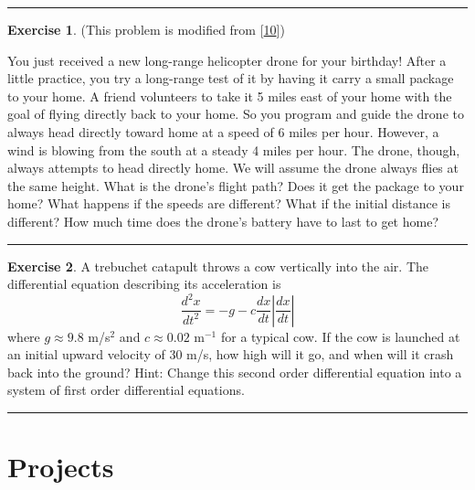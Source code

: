 \documentclass[
]{book}
\theoremstyle{definition}
\theoremstyle{definition}
\theoremstyle{definition}
\newtheorem{exercise}{Exercise}[chapter]
\theoremstyle{remark}
\begin{document}
\begin{center}\rule{0.5\linewidth}{0.5pt}\end{center}

\begin{exercise}
\protect\hypertarget{exr:unnamed-chunk-506}{}{\label{exr:unnamed-chunk-506} }(This problem is modified from {[}\protect\hyperlink{ref-drone}{10}{]})

You just received a new long-range helicopter drone for your birthday!
After a little practice, you try a long-range test of it by having it
carry a small package to your home. A friend volunteers to take it 5
miles east of your home with the goal of flying directly back to your
home. So you program and guide the drone to always head directly toward
home at a speed of 6 miles per hour. However, a wind is blowing from the
south at a steady 4 miles per hour. The drone, though, always attempts
to head directly home. We will assume the drone always flies at the same
height. What is the drone's flight path? Does it get the package to your
home? What happens if the speeds are different? What if the initial
distance is different? How much time does the drone's battery have to
last to get home?
\end{exercise}

\begin{center}\rule{0.5\linewidth}{0.5pt}\end{center}

\begin{exercise}
\protect\hypertarget{exr:unnamed-chunk-507}{}{\label{exr:unnamed-chunk-507} }A trebuchet catapult throws a cow vertically into the air. The
differential equation describing its acceleration is
\[\frac{d^2x}{dt^2} = -g - c \frac{dx}{dt} \left| \frac{dx}{dt} \right|\]
where \(g \approx 9.8\) m/s\(^2\) and \(c \approx 0.02\) m\(^{-1}\) for a
typical cow. If the cow is launched at an initial upward velocity of 30
m/s, how high will it go, and when will it crash back into the ground?
Hint: Change this second order differential equation into a system of
first order differential equations.
\end{exercise}

\begin{center}\rule{0.5\linewidth}{0.5pt}\end{center}

\hypertarget{projects-3}{%
\section{Projects}\label{projects-3}}
\end{document}

